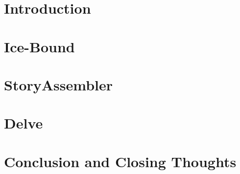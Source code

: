\documentclass[11pt]{ucthesis}
\begin{document}

\chapter{Introduction}

\chapter{Ice-Bound}

\chapter{StoryAssembler}

\chapter{Delve}

\chapter{Conclusion and Closing Thoughts}




\end{document}
